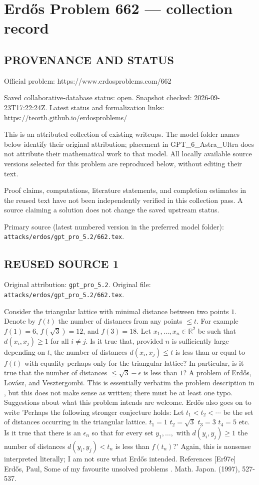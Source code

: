 \section*{Erd\H{o}s Problem 662 --- collection record}

\subsection*{PROVENANCE AND STATUS}
Official problem: https://www.erdosproblems.com/662

Saved collaborative-database status: open.
Snapshot checked: 2026-09-23T17:22:24Z.
Latest status and formalization links: https://teorth.github.io/erdosproblems/

This is an attributed collection of existing writeups. The model-folder names below identify their original attribution; placement in GPT\_6\_Astra\_Ultra does not attribute their mathematical work to that model. All locally available source versions selected for this problem are reproduced below, without editing their text.

Proof claims, computations, literature statements, and completion estimates in the reused text have not been independently verified in this collection pass. A source claiming a solution does not change the saved upstream status.

Primary source (latest numbered version in the preferred model folder): \texttt{attacks/erdos/gpt\_pro\_5.2/662.tex}.

\subsection*{REUSED SOURCE 1}
Original attribution: \texttt{gpt\_pro\_5.2}.
Original file: \texttt{attacks/erdos/gpt\_pro\_5.2/662.tex}.


Consider the triangular lattice with minimal distance between two points $1$. Denote by $f(t)$ the number of distances from any points $\leq t$. For example $f(1)=6$, $f(\sqrt{3})=12$, and $f(3)=18$. Let $x_1,\ldots,x_n\in \mathbb{R}^2$ be such that $d(x_i,x_j)\geq 1$ for all $i\neq j$. Is it true that, provided $n$ is sufficiently large depending on $t$, the number of distances $d(x_i,x_j)\leq t$ is less than or equal to $f(t)$ with equality perhaps only for the triangular lattice? In particular, is it true that the number of distances $\leq \sqrt{3}-\epsilon$ is less than $1$? A problem of Erd\H{o}s, Lov\'{a}sz, and Vesztergombi. This is essentially verbatim the problem description in \cite{Er97e}, but this does not make sense as written; there must be at least one typo. Suggestions about what this problem intends are welcome. Erd\H{o}s also goes on to write 'Perhaps the following stronger conjecture holds: Let $t_1<t_2<\cdots$ be the set of distances occurring in the triangular lattice. $t_1=1$ $t_2=\sqrt{3}$ $t_3=3$ $t_4=5$ etc. Is it true that there is an $\epsilon_n$ so that for every set $y_1,\ldots,$ with $d(y_i,y_j)\geq 1$ the number of distances $d(y_i,y_j)<t_n$ is less than $f(t_n)$?' Again, this is nonsense interpreted literally; I am not sure what Erd\H{o}s intended. References [Er97e] Erd\H{o}s, Paul, Some of my favourite unsolved problems . Math. Japon. (1997), 527-537.


